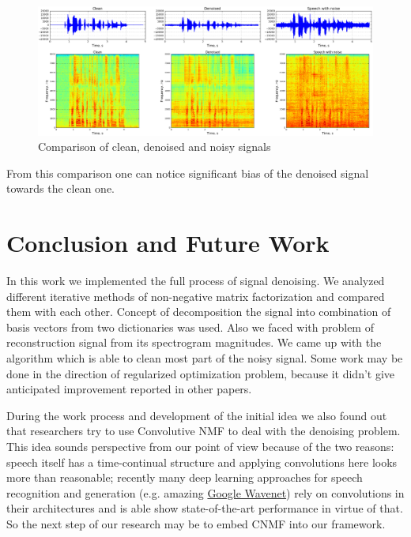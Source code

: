\documentclass[11pt]{article}
\makeatletter
\def\maxwidth{\ifdim\Gin@nat@width>\linewidth\linewidth
    \else\Gin@nat@width\fi}
\makeatother
\begin{document}
\begin{figure}[H]
\centering
\includegraphics[width=1.\maxwidth]{spectrograms.png}
\caption{Comparison of clean, denoised and noisy signals}
\label{fig:comparison}
\end{figure}

From this comparison one can notice significant bias of the denoised signal towards the clean one.

\section{Conclusion and Future Work}

In this work we implemented the full process of signal denoising. We analyzed different iterative methods of non-negative matrix factorization and compared them with each other. Concept of decomposition the signal into combination of basis vectors from two dictionaries was used. Also we faced with problem of reconstruction signal from its spectrogram magnitudes. We came up with the algorithm which is able to clean most part of the noisy signal. Some work may be done in the direction of regularized optimization problem, because it didn't give anticipated improvement reported in other papers.

During the work process and development of the initial idea we also found out that researchers \cite{vaz, ogrady} try to use Convolutive NMF to deal with the denoising problem. This idea sounds perspective from our point of view because of the two reasons: speech itself has a time-continual structure and applying convolutions here looks more than reasonable; recently many deep learning approaches for speech recognition and generation (e.g. amazing \href{https://deepmind.com/blog/wavenet-generative-model-raw-audio/}{Google Wavenet}) rely on convolutions in their architectures and is able show state-of-the-art performance in virtue of that. So the next step of our research may be to embed CNMF into our framework.
\end{document}
